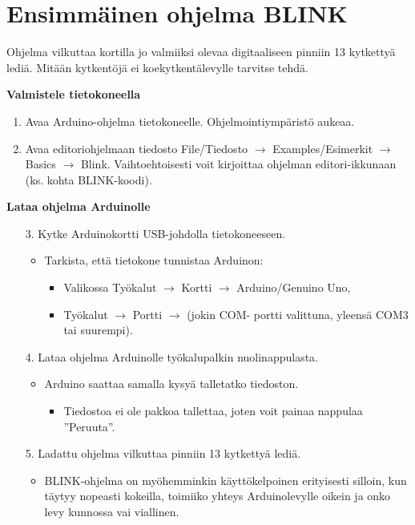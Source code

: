 \section{Ensimmäinen ohjelma BLINK}
Ohjelma vilkuttaa kortilla jo valmiiksi olevaa digitaaliseen pinniin 13 kytkettyä lediä. Mitään kytkentöjä ei koekytkentälevylle tarvitse tehdä.

\textbf{Valmistele tietokoneella}
\begin{enumerate}
    \item Avaa Arduino-ohjelma tietokoneelle. Ohjelmointiympäristö aukeaa.
    \item Avaa editoriohjelmaan tiedosto File/Tiedosto $\rightarrow$ Examples/Esimerkit $\rightarrow$ Basics $\rightarrow$ Blink. Vaihtoehtoisesti voit kirjoittaa ohjelman editori-ikkunaan (ks. kohta BLINK-koodi).
\end{enumerate}
\textbf{Lataa ohjelma Arduinolle}
\begin{enumerate}
    \item[3.] Kytke Arduinokortti USB-johdolla tietokoneeseen.
\begin{itemize}
    \item Tarkista, että tietokone tunnistaa Arduinon:
    \begin{itemize}
        \item Valikossa Työkalut $\rightarrow$ Kortti $\rightarrow$ Arduino/Genuino Uno,
        \item Työkalut $\rightarrow$ Portti $\rightarrow$ (jokin COM- portti valittuna, yleensä COM3 tai  suurempi).
    \end{itemize}
    
\end{itemize}
    \item[4.] Lataa ohjelma Arduinolle työkalupalkin nuolinappulasta.
    \begin{itemize}
        \item Arduino saattaa samalla kysyä talletatko tiedoston.
        \begin{itemize}
            \item Tiedostoa ei ole pakkoa tallettaa, joten voit painaa nappulaa ”Peruuta”. 
        \end{itemize}
    \end{itemize}
    \item[5.] Ladattu ohjelma vilkuttaa pinniin 13 kytkettyä lediä.
    \begin{itemize}
        \item BLINK-ohjelma on myöhemminkin käyttökelpoinen erityisesti silloin, kun täytyy nopeasti kokeilla, toimiiko yhteys Arduinolevylle oikein ja onko levy kunnossa vai viallinen.
    \end{itemize}
\end{enumerate}
